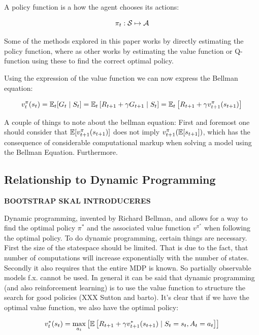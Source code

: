 A policy function is a how the agent chooses its actions:

\begin{equation}
    \pi_t : \mathcal{S} \mapsto \mathcal{A} 
\end{equation}

Some of the methods explored in this paper works by directly estimating the policy function, where as other works by estimating the value function or Q-function using these to find the correct optimal policy.

Using the expression of the value function we can now express the Bellman equation:

\begin{equation}
    v^{\pi}_{t} (s_t) = \mathbb{E}_t [G_t \mid S_t] = \mathbb{E}_t  \left[ R_{t+1} + \gamma G_{t+1} \mid S_t \right] = \mathbb{E}_t \left[ R_{t+1} + \gamma v_{t+1}^{\pi}(s_{t+1}) \right]
\end{equation}

A couple of things to note about the bellman equation: First and foremost one should consider that $\mathbb{E} [v_{t+1}^\pi(s_{t+1})]$ does not imply $v_{t+1}^{\pi}(\mathbb{E}[s_{t+1}])$, which has the consequence of considerable computational markup when solving a model using the Bellman Equation. Furthermore.

\subsection{Relationship to Dynamic Programming}\label{sec:dynamic_programming}

\textbf{BOOTSTRAP SKAL INTRODUCERES}

Dynamic programming, invented by Richard Bellman, and allows for a way to find the optimal policy $\pi^{*}$ and the associated value function $v^{\pi^{*}}$ when following the optimal policy. To do dynamic programming, certain things are necessary. First the size of the statespace should be limited. That is due to the fact, that number of computations will increase exponentially with the number of states. Secondly it also requires that the entire MDP is known. So partially observable models f.x. cannot be used. In general it can be said that dynamic programming (and also reinforcement learning) is to use the value function to structure the search for good policies  (XXX Sutton and barto). It's clear that if we have the optimal value function, we also have the optimal policy:

\begin{equation}
    v_t^{*}(s_t) = \underset{a_t}{\max} \left[ \mathbb{E} \left[ R_{t+1} + \gamma v^{*}_{t+1}(s_{t+1}) \mid S_t = s_t, A_t = a_t\right] \right]
\end{equation}

